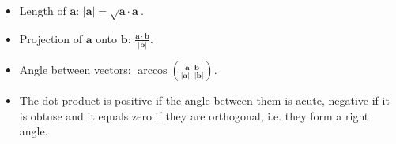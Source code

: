 \begin{itemize}
    \item Length of $\mathbf a$: $|\mathbf a| = \sqrt{\mathbf a\cdot \mathbf a}$.
    \item Projection of $\mathbf a$ onto $\mathbf b$: $\frac{\mathbf a\cdot\mathbf b}{|\mathbf b|}$.
    \item Angle between vectors: $\arccos \left(\frac{\mathbf a\cdot \mathbf b}{|\mathbf a| \cdot |\mathbf b|}\right)$.
    \item The dot product is positive if the angle between them is acute, negative if it is obtuse and it equals zero if they are orthogonal, i.e. they form a right angle.
\end{itemize}